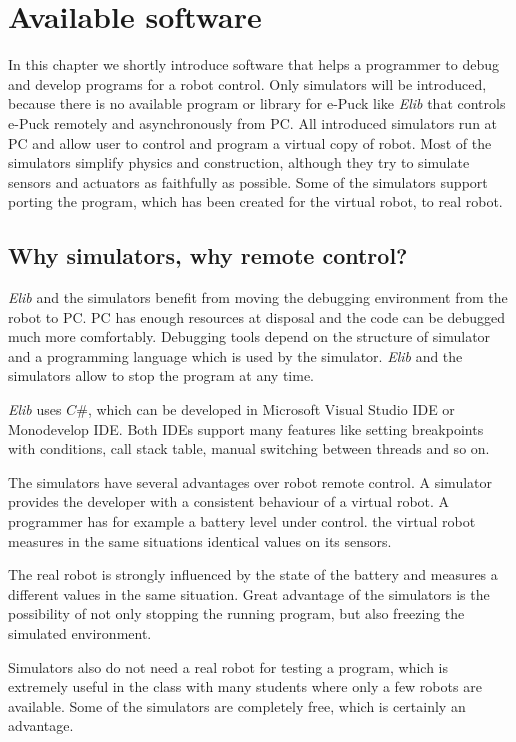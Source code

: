 \chapter{Available software} \label{chap:software}
  In this chapter we shortly introduce software that helps a programmer
  to debug and develop programs for a robot control. 
  Only simulators will be introduced, because 
  there is no available program or library for e-Puck like {\it Elib}
  that controls e-Puck remotely and asynchronously from PC.
  All introduced simulators run at PC and allow user to control and program a virtual copy of robot.
  Most of the simulators simplify physics and construction, although they try to simulate sensors
  and actuators as faithfully as possible. Some of the simulators support porting the program,
  which has been created for the virtual robot, to real robot.
  
\section{Why simulators, why remote control?}
  {\it Elib} and the simulators benefit from moving the debugging environment from the robot to PC.
  PC has enough resources at disposal and the code can be debugged much more comfortably. Debugging
  tools depend on the structure of simulator and a programming language which is used by the simulator.
  {\it Elib} and the simulators allow to stop the program at any time.
  
  {\it Elib} uses $C\#$, which can be developed in Microsoft Visual Studio IDE 
  or Monodevelop IDE.
  Both IDEs support many features like setting breakpoints with conditions, call stack table,
  manual switching between threads and so on.
  
  The simulators have several advantages over robot remote control.
  A simulator provides the developer with a consistent behaviour of a virtual robot.
  A programmer has for example a battery level under control. 
  the virtual robot measures in the same situations identical values on its sensors. 
  
  The real robot is strongly influenced by the state of the battery
  and measures a different values in the same situation.
  Great advantage of the simulators is the possibility of not only stopping
  the running program, but also freezing the simulated environment. 
  
  Simulators also do not need a real robot for testing a program, which is extremely
  useful in the class with many students where only a few robots are available.
  Some of the simulators are completely free, which is certainly an advantage. 
  
